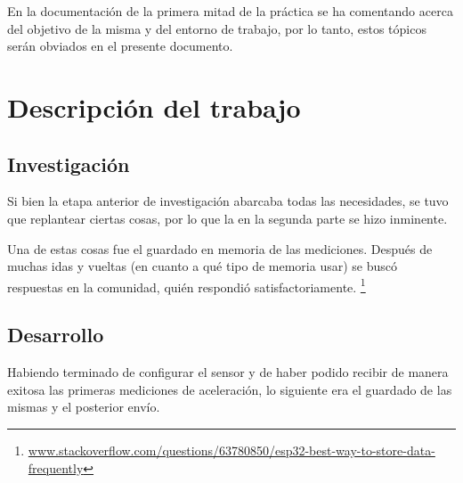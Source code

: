 \documentclass{article}
\newcommand{ \fnstackof }{\footnote{\url{www.stackoverflow.com/questions/63780850/esp32-best-way-to-store-data-frequently}}}
\begin{document}
    En la documentación de la primera mitad de la práctica se ha comentando 
    acerca del objetivo de la misma y del entorno de trabajo, por lo tanto, 
    estos tópicos serán obviados en el presente documento.


    \newpage
    \section{Descripción del trabajo}   

    \subsection{Investigación}
    Si bien la etapa anterior de investigación abarcaba todas las necesidades,
    se tuvo que replantear ciertas cosas, por lo que la en la segunda parte se
    hizo inminente. \par
    Una de estas cosas fue el guardado en memoria de las mediciones. Después 
    de muchas idas y vueltas (en cuanto a qué tipo de memoria usar) se buscó
    respuestas en la comunidad, quién respondió satisfactoriamente. \fnstackof

    \subsection{Desarrollo}
    Habiendo terminado de configurar el sensor y de haber podido recibir de 
    manera exitosa las primeras mediciones de aceleración, lo siguiente era
    el guardado de las mismas y el posterior envío. 
\end{document}
